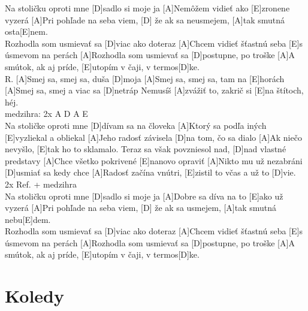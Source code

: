 \documentclass[10pt]{article}
\begin{document}
\begin{Large}
\begin{minipage}{\textwidth}
\begin{multicols}{2}
\begin{guitar}
	[A]Na stoličku oproti mne [D]sadlo si moje ja
	[A]Nemôžem vidieť ako [E]zronene vyzerá
	[A]Pri pohľade na seba viem, 
	[D] že ak sa neusmejem,
	[A]tak smutná osta[E]nem.
	\\
	[A]Rozhodla som usmievať sa [D]viac ako doteraz
	[A]Chcem vidieť šťastnú seba 
	[E]s úsmevom na perách
	[A]Rozhodla som usmievať sa 
	[D]postupne, po troške
	[A]A smútok, ak aj príde, 
	[E]utopím v čaji, v termos[D]ke.
	\\
	R.
	[A]Smej sa, smej sa, duša [D]moja
	[A]Smej sa, smej sa, tam na [E]horách
	[A]Smej sa, smej a viac sa [D]netráp
	Nemusíš [A]zvážiť to, zakrič si [E]na štítoch, héj.
	\\
	medzihra: 2x A D A E
	\\
	[A]Na stoličke oproti mne [D]dívam sa na človeka
	[A]Ktorý sa podľa iných [E]vyzliekal a obliekal
	[A]Jeho radosť závisela [D]na tom, čo sa dialo
	[A]Ak niečo nevyšlo, [E]tak ho to sklamalo.
	\columnbreak
	[A]Teraz sa však povzniesol nad, 
	[D]nad vlastné predstavy
	[A]Chce všetko pokrivené [E]nanovo opraviť
	[A]Nikto mu už nezabráni [D]usmiať sa kedy chce
	[A]Radosť začína vnútri, 
	[E]zistil to včas a už to [D]vie.
	\\
	2x Ref. + medzihra
	\\
	[A]Na stoličku oproti mne [D]sadlo si moje ja
	[A]Dobre sa díva na to [E]ako už vyzerá
	[A]Pri pohľade na seba viem, 
	[D] že ak sa usmejem,
	[A]tak smutná nebu[E]dem.
	\\
	[A]Rozhodla som usmievať sa [D]viac ako doteraz
	[A]Chcem vidieť šťastnú seba 
	[E]s úsmevom na perách
	[A]Rozhodla som usmievať sa 
	[D]postupne, po troške
	[A]A smútok, ak aj príde, 
	[E]utopím v čaji, v termos[D]ke.
\end{guitar}
\end{multicols}
\end{minipage}


\begin{minipage}{\textwidth}
\section{Koledy}

\end{minipage}
\end{Large}
\end{document}
